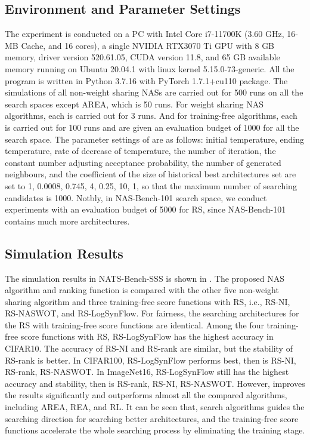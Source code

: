 \documentclass[sigconf]{acmart}
\begin{document}
    \subsection{Environment and Parameter Settings}
    The experiment is conducted on a PC with Intel Core i7-11700K (3.60 GHz, 16-MB Cache, and 16 cores), 
    a single NVIDIA RTX3070 Ti GPU with 8 GB memory, driver version 520.61.05, CUDA version 11.8, and 
    65 GB available memory running on Ubuntu 20.04.1 with linux kernel 5.15.0-73-generic. All the program 
    is written in Python 3.7.16 with PyTorch 1.7.1+cu110 package. The simulations of all 
    non-weight sharing NASs are carried out for 500 runs on all the search spaces except AREA, which is 50 runs. 
    For weight sharing NAS algorithms, each is carried out for 3 runs. And for training-free 
    algorithms, each is carried out for 100 runs and are given an evaluation 
    budget of 1000 for all the search space. The parameter settings of \palg{} are as follows: 
    initial temperature, ending temperature, rate of decrease of temperature, the number of iteration, 
    the constant number adjusting acceptance probability, the number of generated neighbours, and 
    the coefficient of the size of historical best architectures set are set 
    to 1, 0.0008, 0.745, 4, 0.25, 10, 1, so that the maximum number of searching candidates is 1000. 
    Notbly, in NAS-Bench-101 search space, we conduct experiments with an evaluation budget of 5000 for RS, 
    since NAS-Bench-101 contains much more architectures.

    \subsection{Simulation Results} %
    The simulation results in NATS-Bench-SSS \cite{Dong_2021} is shown in . 
    The proposed NAS algorithm and ranking function is compared with the other five non-weight sharing 
    algorithm and three training-free score functions with RS, i.e., RS-NI, RS-NASWOT, 
    and RS-LogSynFlow. For fairness, the searching architectures for the RS with training-free 
    score functions are identical. Among the four training-free score functions with RS, RS-LogSynFlow 
    has the highest accuracy in CIFAR10. The accuracy of RS-NI and RS-rank are similar, but the stability 
    of RS-rank is better. In CIFAR100, RS-LogSynFlow performs best, then is RS-NI, RS-rank, RS-NASWOT. 
    In ImageNet16, RS-LogSynFlow still has the highest accuracy and stability, then is RS-rank, RS-NI, 
    RS-NASWOT. However, \palg{} improves the results significantly and outperforms almost all the 
    compared algorithms, including AREA, REA, and RL. It can be seen that, search algorithms guides 
    the searching direction for searching better architectures, and the training-free score functions
    accelerate the whole searching process by eliminating the training stage. 
\end{document}
